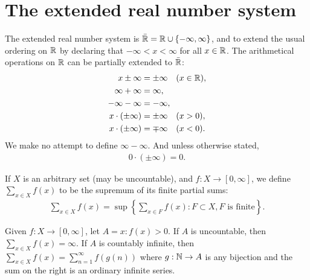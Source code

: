\section{The extended real number system}

\begin{definition}
    The extended real number system is $\bar{\mathbb{R}} = \mathbb{R} \cup \{ -\infty, \infty \}$, and to extend the usual ordering on $\mathbb{R}$ by declaring that $-\infty < x < \infty$ for all $x \in \mathbb{R}$.
    The arithmetical operations on $\mathbb{R}$ can be partially extended to $\bar{\mathbb{R}}$:
    \begin{align}
        x \pm \infty &= \pm \infty \quad (x \in \mathbb{R}), \\
        \infty + \infty &= \infty, \\
        -\infty -\infty &= -\infty, \\
        x \cdot (\pm \infty) &= \pm \infty \quad (x > 0), \\
        x \cdot (\pm \infty) &= \mp \infty \quad (x < 0).
    \end{align}
    We make no attempt to define $\infty - \infty$.
    And unless otherwise stated, 
    \begin{align}
        0 \cdot (\pm \infty) = 0.
    \end{align}
\end{definition}

\begin{definition}
    If $X$ is an arbitrary set (may be uncountable), and $f: X \to [0, \infty]$, we define $\sum_{x \in X} f(x)$ to be the supremum of its finite partial sums:
    \begin{align}
        \sum_{x \in X} f(x) = \sup \left\{ \sum_{x \in F} f(x): F \subset X, F \text{ is finite} \right\}.
    \end{align} 
\end{definition}

\begin{proposition}
    Given $f: X \to [0, \infty]$, let $A = {x: f(x) > 0}$.
    If $A$ is uncountable, then $\sum_{x \in X} f(x) = \infty$.
    If $A$ is countably infinite, then $\sum_{x \in X} f(x) = \sum_{n=1}^{\infty} f(g(n))$ where $g: \mathbb{N} \to A$ is any bijection and the sum on the right is an ordinary infinite series.
\end{proposition}

